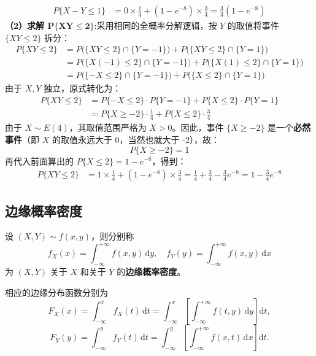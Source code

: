 ﻿\documentclass[lang=cn,11pt]{elegantbook}
\begin{document}
\begin{solution}
\begin{align*}
P\{X-Y \leqslant 1\} &= 0 \times \frac{1}{4} + (1 - e^{-8}) \times \frac{3}{4} = \frac{3}{4}(1 - e^{-8})
\end{align*}
\textbf{（2）求解 $\boldsymbol{P\{XY \leqslant 2\}}$}:采用相同的全概率分解逻辑，按 $Y$ 的取值将事件 $\{XY \leqslant 2\}$ 拆分：
\begin{align*}
P\{XY \leqslant 2\} &= P\big( \{XY \leqslant 2\} \cap \{Y=-1\} \big) + P\big( \{XY \leqslant 2\} \cap \{Y=1\} \big) \\
&= P\big( \{X(-1) \leqslant 2\} \cap \{Y=-1\} \big) + P\big( \{X(1) \leqslant 2\} \cap \{Y=1\} \big) \\
&= P\big( \{-X \leqslant 2\} \cap \{Y=-1\} \big) + P\big( \{X \leqslant 2\} \cap \{Y=1\} \big)
\end{align*}
由于 $X, Y$ 独立，原式转化为：
\begin{align*}
P\{XY \leqslant 2\} &= P\{-X \leqslant 2\} \cdot P\{Y=-1\} + P\{X \leqslant 2\} \cdot P\{Y=1\} \\
&= P\{X \geqslant -2\} \cdot \frac{1}{4} + P\{X \leqslant 2\} \cdot \frac{3}{4}
\end{align*}
由于 $X \sim E(4)$，其取值范围严格为 $X > 0$。因此，事件 $\{X \geqslant -2\}$ 是一个\textbf{必然事件}（即 $X$ 的取值永远大于 0，当然也就大于 -2），故：
\[
P\{X \geqslant -2\} = 1
\]
再代入前面算出的 $P\{X \leqslant 2\} = 1 - e^{-8}$，得到：
\begin{align*}
P\{XY \leqslant 2\} &= 1 \times \frac{1}{4} + (1 - e^{-8}) \times \frac{3}{4} = \frac{1}{4} + \frac{3}{4} - \frac{3}{4} e^{-8} = 1 - \frac{3}{4} e^{-8}
\end{align*}
\end{solution}

\subsection{边缘概率密度}

\begin{definition}[边缘概率密度] \label{def:marginal-pdf}
设 $(X,Y) \sim f(x,y)$，则分别称
\[
f_X(x) = \int_{-\infty}^{+\infty}f(x,y)\,\mathrm{d}y, \quad f_Y(y) = \int_{-\infty}^{+\infty}f(x,y)\,\mathrm{d}x
\]
为 $(X,Y)$ 关于 $X$ 和关于 $Y$ 的\textbf{边缘概率密度}。
\end{definition}

相应的边缘分布函数分别为
\[
F_X(x) = \int_{-\infty}^{x}f_X(t)\,\mathrm{d}t = \int_{-\infty}^{x}\left[\int_{-\infty}^{+\infty}f(t,y)\,\mathrm{d}y\right]\mathrm{d}t,
\]
\[
F_Y(y) = \int_{-\infty}^{y}f_Y(t)\,\mathrm{d}t = \int_{-\infty}^{y}\left[\int_{-\infty}^{+\infty}f(x,t)\,\mathrm{d}x\right]\mathrm{d}t.
\]
\end{document}
